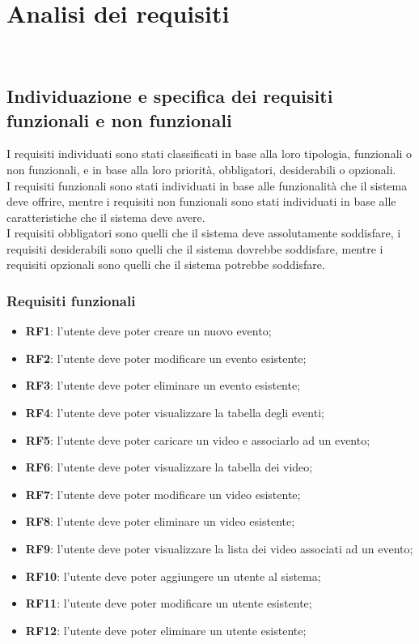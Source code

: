 \chapter{Analisi dei requisiti}
\label{cap:analisi-requisiti}
\\

\section{Individuazione e specifica dei requisiti funzionali e non funzionali}

I requisiti individuati sono stati classificati in base alla loro tipologia, funzionali o non funzionali, e in base alla loro priorità, obbligatori, desiderabili o opzionali.\\
I requisiti funzionali sono stati individuati in base alle funzionalità che il sistema deve offrire, mentre i requisiti non funzionali sono stati individuati in base alle caratteristiche che il sistema deve avere.\\
I requisiti obbligatori sono quelli che il sistema deve assolutamente soddisfare, i requisiti desiderabili sono quelli che il sistema dovrebbe soddisfare, mentre i requisiti opzionali sono quelli che il sistema potrebbe soddisfare.\\

\subsection{Requisiti funzionali}

\begin{itemize}
    \item \textbf{RF1}: l'utente deve poter creare un nuovo evento;
    \item \textbf{RF2}: l'utente deve poter modificare un evento esistente;
    \item \textbf{RF3}: l'utente deve poter eliminare un evento esistente;
    \item \textbf{RF4}: l'utente deve poter visualizzare la tabella degli eventi;
    \item \textbf{RF5}: l'utente deve poter caricare un video e associarlo ad un evento;
    \item \textbf{RF6}: l'utente deve poter visualizzare la tabella dei video;
    \item \textbf{RF7}: l'utente deve poter modificare un video esistente;
    \item \textbf{RF8}: l'utente deve poter eliminare un video esistente;
    \item \textbf{RF9}: l'utente deve poter visualizzare la lista dei video associati ad un evento;
    \item \textbf{RF10}: l'utente deve poter aggiungere un utente al sistema;
    \item \textbf{RF11}: l'utente deve poter modificare un utente esistente;
    \item \textbf{RF12}: l'utente deve poter eliminare un utente esistente;
\end{itemize}

